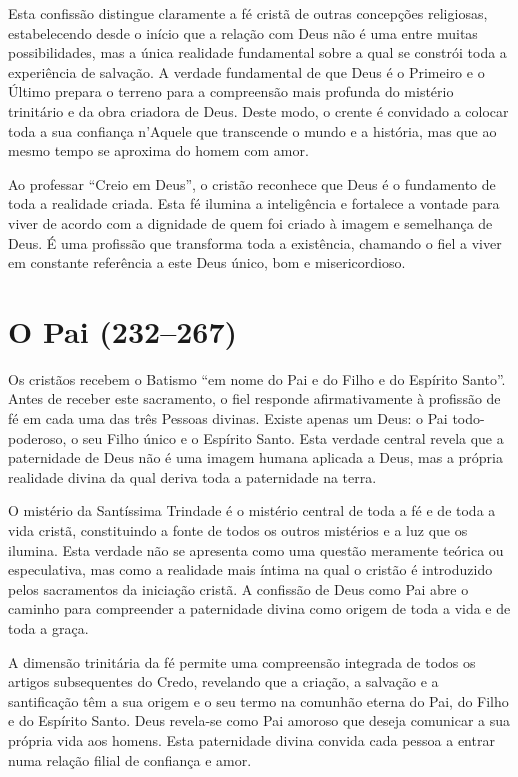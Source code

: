 Esta confissão distingue claramente a fé cristã de outras concepções religiosas, estabelecendo desde o início que a relação com Deus não é uma entre muitas possibilidades, mas a única realidade fundamental sobre a qual se constrói toda a experiência de salvação. A verdade fundamental de que Deus é o Primeiro e o Último prepara o terreno para a compreensão mais profunda do mistério trinitário e da obra criadora de Deus. Deste modo, o crente é convidado a colocar toda a sua confiança n’Aquele que transcende o mundo e a história, mas que ao mesmo tempo se aproxima do homem com amor.

Ao professar ``Creio em Deus'', o cristão reconhece que Deus é o fundamento de toda a realidade criada. Esta fé ilumina a inteligência e fortalece a vontade para viver de acordo com a dignidade de quem foi criado à imagem e semelhança de Deus. É uma profissão que transforma toda a existência, chamando o fiel a viver em constante referência a este Deus único, bom e misericordioso.

\section{O Pai (232--267)}

Os cristãos recebem o Batismo ``em nome do Pai e do Filho e do Espírito Santo''. Antes de receber este sacramento, o fiel responde afirmativamente à profissão de fé em cada uma das três Pessoas divinas. Existe apenas um Deus: o Pai todo-poderoso, o seu Filho único e o Espírito Santo. Esta verdade central revela que a paternidade de Deus não é uma imagem humana aplicada a Deus, mas a própria realidade divina da qual deriva toda a paternidade na terra.

O mistério da Santíssima Trindade é o mistério central de toda a fé e de toda a vida cristã, constituindo a fonte de todos os outros mistérios e a luz que os ilumina. Esta verdade não se apresenta como uma questão meramente teórica ou especulativa, mas como a realidade mais íntima na qual o cristão é introduzido pelos sacramentos da iniciação cristã. A confissão de Deus como Pai abre o caminho para compreender a paternidade divina como origem de toda a vida e de toda a graça.

A dimensão trinitária da fé permite uma compreensão integrada de todos os artigos subsequentes do Credo, revelando que a criação, a salvação e a santificação têm a sua origem e o seu termo na comunhão eterna do Pai, do Filho e do Espírito Santo. Deus revela-se como Pai amoroso que deseja comunicar a sua própria vida aos homens. Esta paternidade divina convida cada pessoa a entrar numa relação filial de confiança e amor.


